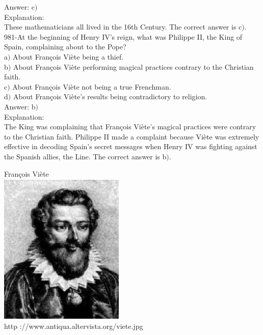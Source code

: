 \documentclass[letterpaper, 12pt]{article}
\begin{document}
Answer: c$)$\\

Explanation: \\
These mathematicians all lived in the 16th Century. The correct answer is c$)$.\\

981-At the beginning of Henry IV's reign, what was Philippe II, the King of Spain, complaining about to the Pope?\\

a$)$ About Fran\c cois Vi\`ete being a thief. \\
b$)$ About Fran\c cois Vi\`ete performing magical practices contrary to the Christian faith. \\
c$)$ About Fran\c cois Vi\`ete not being a true Frenchman. \\
d$)$ About Fran\c cois Vi\`ete's results being contradictory to religion. \\

Answer: b$)$\\

Explanation: \\
The King was complaining that Fran\c cois Vi\`ete's magical practices were contrary to the Christian faith. Philippe II made a complaint because Vi\`ete was extremely effective in decoding Spain's secret messages when Henry IV was fighting against the Spanish allies, the Line.  The correct answer is b$)$.\\

        \begin{center}
        Fran\c cois Vi\`ete\\
    \includegraphics[width=6cm]{viete.eps}\\
        {\footnotesize http ://www.antiqua.altervista.org/viete.jpg}
    \end{center}
\end{document}
